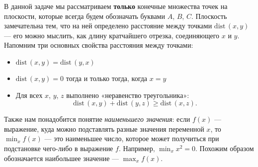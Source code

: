 ﻿
\def\dist{\mathrm{dist}\,} \def\l#1{\limits_{#1}}
\def\Dist{\mathrm{DIST}\,}

\vspace{-0.2cm} 

\ms В данной задаче мы рассматриваем {\bfseries только} конечные множества точек на плоскости, которые всегда будем обозначать буквами $A$, $B$, $C$. Плоскость замечательна тем, что на ней определено расстояние между точками $\dist (x,y)$ — его можно мыслить, как длину кратчайшего отрезка, соединяющего $x$ и $y$. Напомним три основных свойства расстояния между точками:

\vspace{-0.15cm}
\begin{itemize}
	\item $\dist (x,y) = \dist (y,x)$\scolon
	\item $\dist (x,y) = 0$ тогда и только тогда, когда $x=y$\scolon
	\item Для всех $x$, $y$, $z$ выполнено «неравенство треугольника»:
		\vspace{-0.2cm} $$\dist (x,y) + \dist (y,z) \geq \dist (x,z).$$
\end{itemize}

\vspace{-0.4cm}
\ms Также нам понадобится понятие {\itshape наименьшего значения}: если $f(x)$ — выражение, куда можно подставлять разные значения переменной $x$, то $\min_x f(x)$ — это наименьшее число, которое может получиться при подстановке чего-либо в выражение $f$. Например, $\min_x x^2 = 0$. Похожим образом обозначается наибольшее значение — $\max_x f(x)$.

